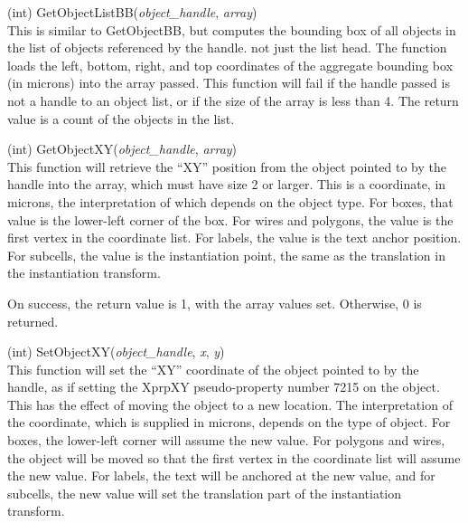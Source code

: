 \begin{description}
\item{(int) \vt GetObjectListBB({\it object\_handle\/}, {\it array\/})}\\
This is similar to {\vt GetObjectBB}, but computes the bounding box of
all objects in the list of objects referenced by the handle.  not just
the list head.  The function loads the left, bottom, right, and top
coordinates of the aggregate bounding box (in microns) into the array
passed.  This function will fail if the handle passed is not a handle
to an object list, or if the size of the array is less than 4.  The
return value is a count of the objects in the list.

\item{(int) \vt GetObjectXY({\it object\_handle\/}, {\it array\/})}\\
This function will retrieve the ``XY'' position from the object
pointed to by the handle into the array, which must have size 2 or
larger.  This is a coordinate, in microns, the interpretation of which
depends on the object type.  For boxes, that value is the lower-left
corner of the box.  For wires and polygons, the value is the first
vertex in the coordinate list.  For labels, the value is the text
anchor position.  For subcells, the value is the instantiation point,
the same as the translation in the instantiation transform.

On success, the return value is 1, with the array values set. 
Otherwise, 0 is returned.

\item{(int) \vt SetObjectXY({\it object\_handle\/}, {\it x\/}, {\it y\/})}\\
This function will set the ``XY'' coordinate of the object pointed to
by the handle, as if setting the {\et XprpXY} pseudo-property number
7215 on the object.  This has the effect of moving the object to a new
location.  The interpretation of the coordinate, which is supplied in
microns, depends on the type of object.  For boxes, the lower-left
corner will assume the new value.  For polygons and wires, the object
will be moved so that the first vertex in the coordinate list will
assume the new value.  For labels, the text will be anchored at the
new value, and for subcells, the new value will set the translation
part of the instantiation transform.


\end{description}

